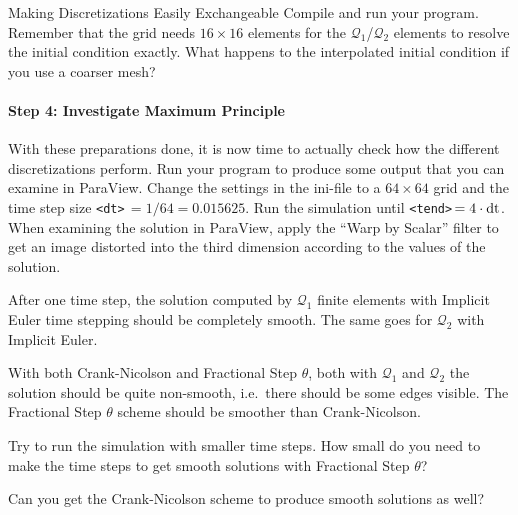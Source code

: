 \documentclass[12pt,a4paper]{article}
\begin{document}
\begin{Exercise}{Making Discretizations Easily Exchangeable}
  Compile and run your program.
  Remember that the grid needs $16\times16$ elements for the
  $\mathcal{Q}_1$/$\mathcal{Q}_2$ elements to resolve the initial
  condition exactly.  What happens to the interpolated initial condition
  if you use a coarser mesh?

  \paragraph{Step 4: Investigate Maximum Principle}

  \lstset{language=bash} With these preparations done, it is now time to
  actually check how the different discretizations perform.  Run your program
  to produce some output that you can examine in ParaView. Change the
  settings in the ini-file to a $64\times 64$ grid and the time step size
  \lstinline!<dt>!$\,=1/64=0.015625$. Run the simulation until
  \lstinline!<tend>!$\,=4 \cdot\textup{dt}$.
  When examining the solution in ParaView, apply the ``Warp by Scalar''
  filter to get an image distorted into the third dimension according to
  the values of the solution.

  After one time step, the solution computed by $\mathcal{Q}_1$ finite
  elements with Implicit Euler time stepping should be completely
  smooth. The same goes for $\mathcal{Q}_2$ with Implicit Euler.

  With both Crank-Nicolson and Fractional Step $\theta$, both with
  $\mathcal{Q}_1$ and $\mathcal{Q}_2$ the solution should be quite
  non-smooth, i.e.\ there should be some edges visible.  The Fractional
  Step $\theta$ scheme should be smoother than Crank-Nicolson.

  Try to run the simulation with smaller time steps.  How small do you need to
  make the time steps to get smooth solutions with Fractional Step $\theta$?

  Can you get the Crank-Nicolson scheme to produce smooth solutions as well?
\end{Exercise}
\end{document}
